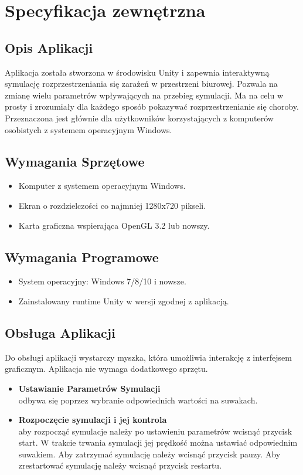 \chapter{Specyfikacja zewnętrzna}
\label{ch:04}

\section{Opis Aplikacji}

Aplikacja została stworzona w środowisku Unity i zapewnia interaktywną symulację rozprzestrzeniania się zarażeń w przestrzeni biurowej. Pozwala na zmianę wielu parametrów wpływających na przebieg symulacji. Ma na celu w prosty i zrozumiały dla każdego sposób pokazywać rozprzestrzenianie się choroby. Przeznaczona jest głównie dla użytkowników korzystających z komputerów osobistych z systemem operacyjnym Windows.

\section{Wymagania Sprzętowe}

\begin{itemize}
	\item Komputer z systemem operacyjnym Windows.
	\item Ekran o rozdzielczości co najmniej 1280x720 pikseli.
	\item Karta graficzna wspierająca OpenGL 3.2 lub nowszy.
\end{itemize}

\section{Wymagania Programowe}

\begin{itemize}
	\item System operacyjny: Windows 7/8/10 i nowsze.
	\item Zainstalowany runtime Unity w wersji zgodnej z aplikacją.
\end{itemize}

\section{Obsługa Aplikacji}

Do obsługi aplikacji wystarczy myszka, która umożliwia interakcję z interfejsem graficznym. Aplikacja nie wymaga dodatkowego sprzętu.
\begin{itemize}
	\item \textbf{Ustawianie Parametrów Symulacji}\\
			odbywa się poprzez wybranie odpowiednich wartości na suwakach.
	\item \textbf{Rozpoczęcie symulacji i jej kontrola}\\
			aby rozpocząć symulacje należy po ustawieniu parametrów wcisnąć przycisk start. W trakcie trwania symulacji jej prędkość można ustawiać odpowiednim suwakiem. Aby zatrzymać symulację należy wcisnąć przycisk pauzy. Aby zrestartować symulację należy wcisnąć przycisk restartu.
\end{itemize}

